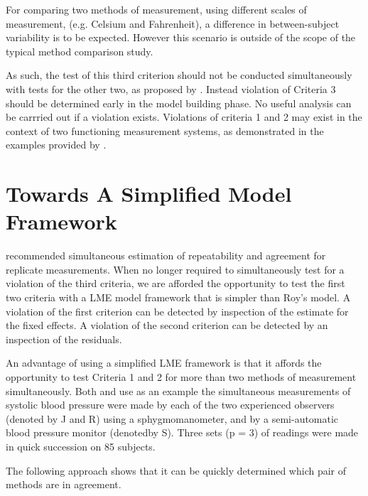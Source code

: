 \documentclass[12pt, a4paper]{report}
\theoremstyle{plain}
\theoremstyle{definition}
\theoremstyle{remark}
\begin{document}
For comparing two methods of measurement, using different scales of measurement, (e.g. Celsium and Fahrenheit), a difference in between-subject variability is to be expected. However this scenario is outside of the scope of the typical method comparison study. 

As such, the test of this third criterion should not be conducted simultaneously with tests for the other two, as proposed by \citet{ARoy2009}. Instead violation of Criteria 3 should be determined early in the model building phase. No useful analysis can be carrried out if a violation exists. Violations of criteria 1 and 2 may exist in the context of two functioning measurement systems, as demonstrated in the examples provided by \citet{ARoy2009}.


\section{Towards A Simplified Model Framework}
\citet{BA99} recommended simultaneous estimation of repeatability and agreement
for replicate measurements. When no longer required to simultaneously test for a violation of the third criteria, we are afforded the opportunity to test the first two criteria with a LME model framework that is simpler than Roy's model. A violation of the first criterion can be detected by inspection of the estimate for the fixed effects. A violation of the second criterion can be detected by an inspection of the residuals.

An advantage of using a simplified LME framework is that it affords the opportunity to test Criteria 1 and 2 for more than two methods of measurement simultaneously. Both \citet{BA99} and \citet{ARoy2009} use as an example the simultaneous measurements of systolic blood pressure
were made by each of the two experienced observers (denoted by J and R) using a sphygmomanometer, and by a semi-automatic blood pressure monitor (denotedby S). Three sets (p = 3) of readings were made in quick succession on 85 subjects. 

The following approach shows that it can be quickly determined which pair of methods are in agreement.
\end{document}
